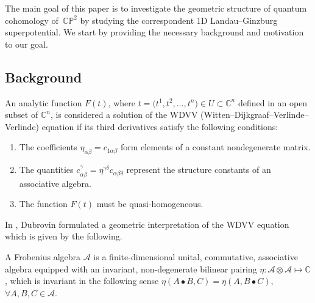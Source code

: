 \documentclass[pdftex]{sigma}
\numberwithin{equation}{section}
\begin{document}
The main goal of this paper is to investigate the geometric structure of quantum cohomology of~$\mathbb{CP}^2$ by studying the correspondent 1D Landau--Ginzburg superpotential. We start by providing the necessary background and motivation to our goal.

\subsection{Background}

\begin{Definition}
An analytic function $F(t)$, where $t = \bigl(t^1, t^2, \dots, t^n\bigr) \in U \subset \mathbb{C}^n$ defined in an open subset of $\mathbb{C}^n$, is considered a solution of the WDVV (Witten--Dijkgraaf--Verlinde--Verlinde) equation if its third derivatives
satisfy the following conditions:
\begin{enumerate}\itemsep=0pt
\item[(1)] The coefficients $\eta_{\alpha\beta} = c_{1\alpha\beta}$ form elements of a constant nondegenerate matrix.
\item[(2)] The quantities $c_{\alpha\beta}^{\gamma} = \eta^{\gamma\delta} c_{\alpha\beta\delta}$ represent the structure constants of an associative algebra.
\item[(3)] The function $F(t)$ must be quasi-homogeneous.
\end{enumerate}
\end{Definition}


In \cite[Chapter~1]{B.Dubrovin2}, Dubrovin formulated a geometric interpretation of the WDVV equation which is given by the following.

\begin{Definition}
A Frobenius algebra $\mathcal{A}$ is a finite-dimensional unital, commutative, associative algebra equipped with an invariant, non-degenerate bilinear pairing
$
\eta \colon \mathcal{A} \otimes \mathcal{A} \mapsto \mathbb{C}$,
which is invariant in the following sense
$
\eta(A \bullet B, C) = \eta(A, B \bullet C)$, $ \forall A, B, C \in \mathcal{A}$.
\end{Definition}
\end{document}
